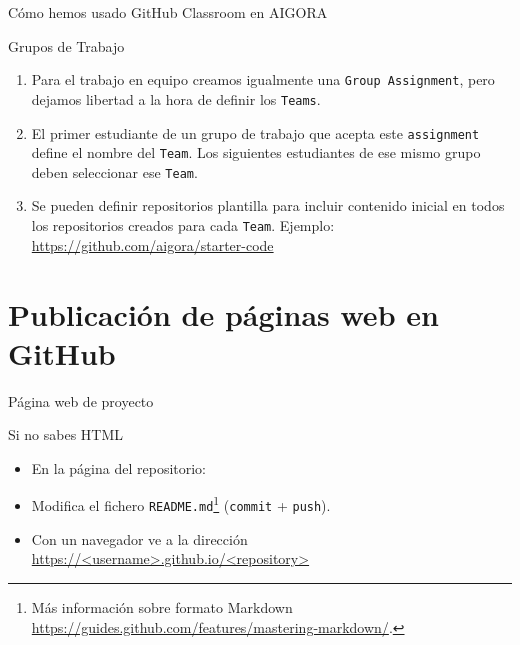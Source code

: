 \documentclass[xcolor={usenames,svgnames,dvipsnames}]{beamer}
\begin{document}
\begin{frame}[label={sec:org6ae8947},fragile]{Cómo hemos usado GitHub Classroom en AIGORA}
 \begin{block}{Grupos de Trabajo}
\begin{enumerate}
\item Para el trabajo en equipo creamos igualmente una \texttt{Group Assignment}, pero dejamos libertad a la hora de definir los \texttt{Teams}.
\item El primer estudiante de un grupo de trabajo que acepta este \texttt{assignment} define el nombre del \texttt{Team}. Los siguientes estudiantes de ese mismo grupo deben seleccionar ese \texttt{Team}.
\item Se pueden definir repositorios plantilla para incluir contenido inicial en todos los repositorios creados para cada \texttt{Team}. Ejemplo: \url{https://github.com/aigora/starter-code}
\end{enumerate}
\end{block}
\end{frame}

\section{Publicación de páginas web en GitHub}
\label{sec:org986abbe}

\begin{frame}[label={sec:org17ce472},fragile]{Página web de \alert{proyecto}}
 \begin{block}{Si no sabes HTML}
\begin{itemize}
\item En la página del repositorio:
\end{itemize}

\begin{center}

\end{center}

\begin{itemize}
\item Modifica el fichero \texttt{README.md}\footnote{Más información sobre formato Markdown \url{https://guides.github.com/features/mastering-markdown/}.} (\texttt{commit} + \texttt{push}).

\item Con un navegador ve a la dirección \url{https://<username>.github.io/<repository>}
\end{itemize}
\end{block}
\end{frame}
\end{document}
